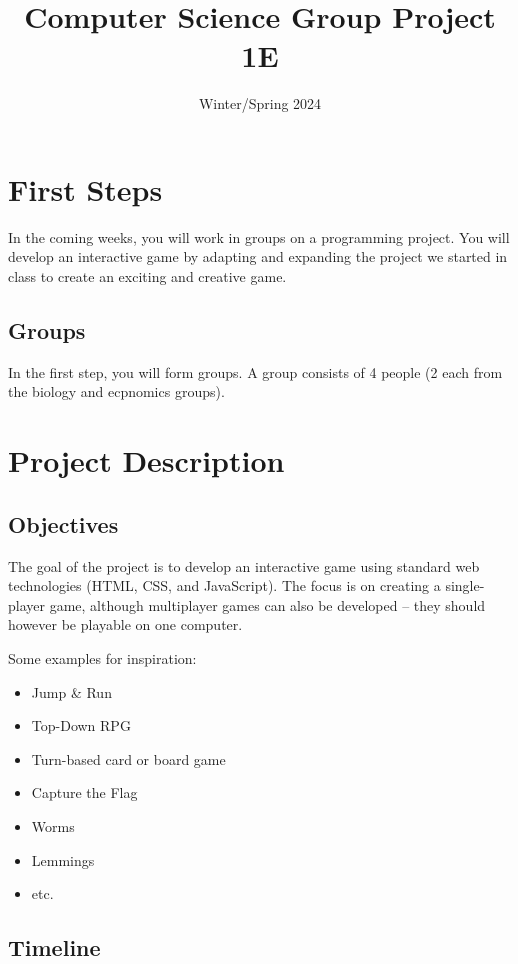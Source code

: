 \documentclass[11pt,a4paper]{report}
\title{Computer Science Group Project 1E}
\date{Winter/Spring 2024}
\begin{document}
\maketitle

\newpage

\section{First Steps}

In the coming weeks, you will work in groups on a programming project. You will develop an interactive game by adapting and expanding the project we started in class to create an exciting and creative game.

\subsection{Groups}

In the first step, you will form groups. A group consists of 4 people (2 each from the biology and ecpnomics groups). 

\newpage

\section{Project Description}

\subsection{Objectives}

The goal of the project is to develop an interactive game using standard web technologies (HTML, CSS, and JavaScript). The focus is on creating a single-player game, although multiplayer games can also be developed -- they should however be playable on one computer.

Some examples for inspiration:
\begin{itemize}
\item Jump \& Run
\item Top-Down RPG
\item Turn-based card or board game
\item Capture the Flag
\item Worms
\item Lemmings
\item etc.
\end{itemize}

\subsection{Timeline}
\end{document}
